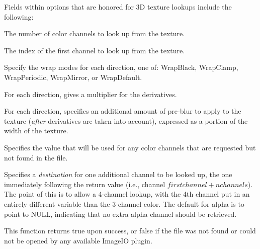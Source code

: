 Fields within {\cf options} that are honored for 3D texture lookups
include the following:

\vspace{-12pt}
\vspace{10pt}
The number of color channels to look up from the texture.
\apiend

\vspace{-24pt}
\vspace{10pt}
The index of the first channel to look up from the texture.
\apiend

\vspace{-24pt}
\vspace{10pt}
Specify the wrap modes for each direction, one of: 
{\cf WrapBlack}, {\cf WrapClamp}, {\cf WrapPeriodic}, {\cf WrapMirror},
or {\cf WrapDefault}.
\apiend

\vspace{-24pt}
\vspace{10pt}
For each direction, gives a multiplier for the derivatives.
\apiend

\vspace{-24pt}
\vspace{10pt}
For each direction, specifies an additional amount of pre-blur to apply
to the texture (\emph{after} derivatives are taken into account),
expressed as a portion of the width of the texture.
\apiend

\vspace{-24pt}
\vspace{10pt}
Specifies the value that will be used for any color channels that are
requested but not found in the file.
\apiend

\vspace{-24pt}
\vspace{10pt}
Specifies a \emph{destination} for one additional channel to be looked
up, the one immediately following the return value (i.e., channel
$\mathit{firstchannel}+\mathit{nchannels}$).  The point of this is to
allow a 4-channel lookup, with the 4th channel put in an entirely
different variable than the 3-channel color.  The default for {\cf
  alpha} is to point to NULL, indicating that no extra alpha channel
should be retrieved.
\apiend

This function returns {\cf true} upon success, or {\cf false} if the
file was not found or could not be opened by any available ImageIO
plugin.

